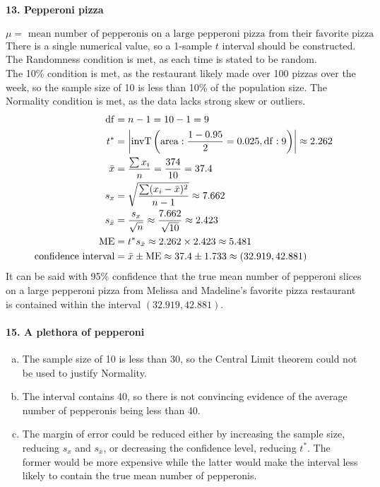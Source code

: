 \documentclass[../Homework]{subfiles}
\begin{document}
		\paragraph{13. Pepperoni pizza}
			\[\mu = \text{ mean number of pepperonis on a large pepperoni pizza from their favorite pizza restaurant}\]
			There is a single numerical value, so a 1-sample $t$ interval should be constructed. \\
			The Randomness condition is met, as each time is stated to be random. \\
			The 10\% condition is met, as the restaurant likely made over 100 pizzas over the week, so the sample size of 10 is less than 10\% of the population size.
			The Normality condition is met, as the data lacks strong skew or outliers.
			\begin{align*}
				\operatorname{df} &= n - 1 = 10 - 1 = 9 \\
				t^* &= \left|\operatorname{invT}\left(\operatorname{area}: \frac{1 - 0.95}{2} = 0.025, \operatorname{df}: 9\right)\right| \approx 2.262 \\
				\bar{x} &= \frac{\sum x_i}{n} = \frac{374}{10} = 37.4 \\
				s_x &= \sqrt{\frac{\sum (x_i - \bar{x})^2}{n - 1}} \approx 7.662 \\
				s_{\bar{x}} &= \frac{s_x}{\sqrt{n}} \approx \frac{7.662}{\sqrt{10}} \approx 2.423 \\
				\operatorname{ME} &= t^*s_{\bar{x}} \approx 2.262 \times 2.423 \approx 5.481 \\
				\text{confidence interval} &= \bar{x} \pm \operatorname{ME} \approx 37.4 \pm 1.733 \approx (32.919, 42.881)
			\end{align*}
			It can be said with 95\% confidence that the true mean number of pepperoni slices on a large pepperoni pizza from Melissa and Madeline's favorite pizza restaurant is contained within the interval $(32.919, 42.881)$.
			\paragraph{15. A plethora of pepperoni}
				\begin{enumerate}[a.]
					\item
						The sample size of 10 is less than 30, so the Central Limit theorem could not be used to justify Normality.
					\item
						The interval contains 40, so there is not convincing evidence of the average number of pepperonis being less than 40.
						\item
							The margin of error could be reduced either by increasing the sample size, reducing $s_x$ and $s_{\bar{x}}$, or decreasing the confidence level, reducing $t^*$. The former would be more expensive while the latter would make the interval less likely to contain the true mean number of pepperonis.
				\end{enumerate}				
\end{document}
